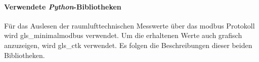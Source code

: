 \paragraph{Verwendete \textit{Python}-Bibliotheken}
Für das Auslesen der raumlufttechnischen Messwerte über das \gls{modbus} Protokoll wird \gls{gls_minimalmodbus} verwendet. Um die erhaltenen Werte auch grafisch anzuzeigen, wird \gls{gls_ctk} verwendet. Es folgen die Beschreibungen dieser beiden Bibliotheken.

